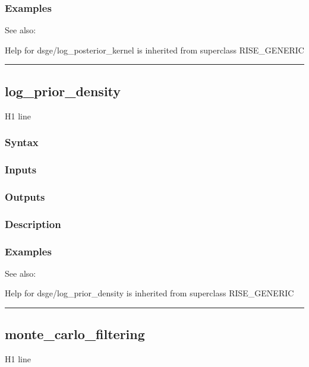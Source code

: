 \documentclass[letterpaper,10pt,english]{sphinxmanual}
\begin{document}
\subsubsection{Examples}
\label{classes/models/@dsge/dsge:id95}
See also:

Help for dsge/log\_posterior\_kernel is inherited from superclass RISE\_GENERIC


\bigskip\hrule{}\bigskip



\subsection{log\_prior\_density}
\label{classes/models/@dsge/dsge:id96}\label{classes/models/@dsge/dsge:log-prior-density}
H1 line


\subsubsection{Syntax}
\label{classes/models/@dsge/dsge:id97}

\subsubsection{Inputs}
\label{classes/models/@dsge/dsge:id98}

\subsubsection{Outputs}
\label{classes/models/@dsge/dsge:id99}

\subsubsection{Description}
\label{classes/models/@dsge/dsge:id100}

\subsubsection{Examples}
\label{classes/models/@dsge/dsge:id101}
See also:

Help for dsge/log\_prior\_density is inherited from superclass RISE\_GENERIC


\bigskip\hrule{}\bigskip



\subsection{monte\_carlo\_filtering}
\label{classes/models/@dsge/dsge:monte-carlo-filtering}\label{classes/models/@dsge/dsge:id102}
H1 line
\end{document}
